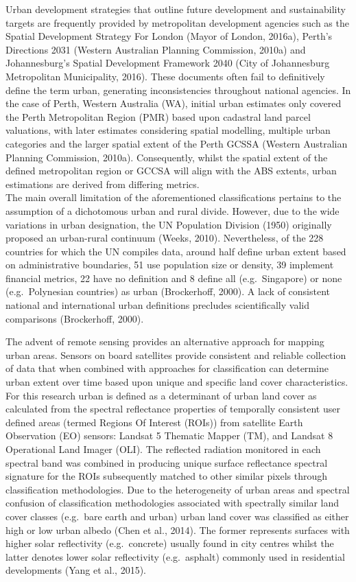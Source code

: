\documentclass[]{book}
\begin{document}
Urban development strategies that outline future development and
sustainability targets are frequently provided by metropolitan
development agencies such as the Spatial Development Strategy For London
(Mayor of London, 2016a), Perth's Directions 2031 (Western Australian
Planning Commission, 2010a) and Johannesburg's Spatial Development
Framework 2040 (City of Johannesburg Metropolitan Municipality, 2016).
These documents often fail to definitively define the term urban,
generating inconsistencies throughout national agencies. In the case of
Perth, Western Australia (WA), initial urban estimates only covered the
Perth Metropolitan Region (PMR) based upon cadastral land parcel
valuations, with later estimates considering spatial modelling, multiple
urban categories and the larger spatial extent of the Perth GCSSA
(Western Australian Planning Commission, 2010a). Consequently, whilst
the spatial extent of the defined metropolitan region or GCCSA will
align with the ABS extents, urban estimations are derived from differing
metrics.\\
The main overall limitation of the aforementioned classifications
pertains to the assumption of a dichotomous urban and rural divide.
However, due to the wide variations in urban designation, the UN
Population Division (1950) originally proposed an urban-rural continuum
(Weeks, 2010). Nevertheless, of the 228 countries for which the UN
compiles data, around half define urban extent based on administrative
boundaries, 51 use population size or density, 39 implement financial
metrics, 22 have no definition and 8 define all (e.g.~Singapore) or none
(e.g.~Polynesian countries) as urban (Brockerhoff, 2000). A lack of
consistent national and international urban definitions precludes
scientifically valid comparisons (Brockerhoff, 2000).

The advent of remote sensing provides an alternative approach for
mapping urban areas. Sensors on board satellites provide consistent and
reliable collection of data that when combined with approaches for
classification can determine urban extent over time based upon unique
and specific land cover characteristics. For this research urban is
defined as a determinant of urban land cover as calculated from the
spectral reflectance properties of temporally consistent user defined
areas (termed Regions Of Interest (ROIs)) from satellite Earth
Observation (EO) sensors: Landsat 5 Thematic Mapper (TM), and Landsat 8
Operational Land Imager (OLI). The reflected radiation monitored in each
spectral band was combined in producing unique surface reflectance
spectral signature for the ROIs subsequently matched to other similar
pixels through classification methodologies. Due to the heterogeneity of
urban areas and spectral confusion of classification methodologies
associated with spectrally similar land cover classes (e.g.~bare earth
and urban) urban land cover was classified as either high or low urban
albedo (Chen et al., 2014). The former represents surfaces with higher
solar reflectivity (e.g.~concrete) usually found in city centres whilst
the latter denotes lower solar reflectivity (e.g.~asphalt) commonly used
in residential developments (Yang et al., 2015).
\end{document}
